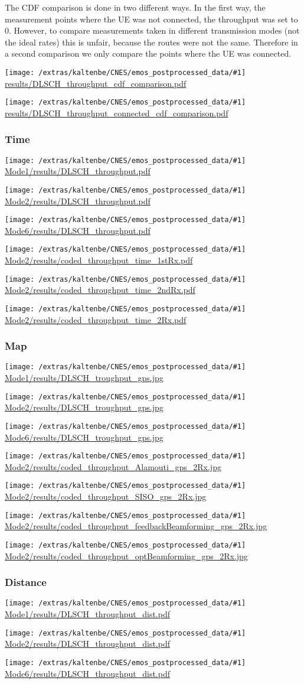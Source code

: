 \documentclass[a4paper,10pt]{article}
\newcommand{\printfile}[1]{
 \begin{minipage}{8cm}
  \centering
  \texttt{[image: /extras/kaltenbe/CNES/emos\_postprocessed\_data/\#1]}
  \url{#1}

 \end{minipage}
}
\begin{document}
The CDF comparison is done in two different ways. In the first way, the measurement points where the UE was not connected, the throughput was set to 0. However, to compare measurements taken in different transmission modes (not the ideal rates) this is unfair, because the routes were not the same. Therefore in a second comparison we only compare the points where the UE was connected.

\printfile{results/DLSCH_throughput_cdf_comparison.pdf}
\printfile{results/DLSCH_throughput_connected_cdf_comparison.pdf}

\subsubsection{Time}

\printfile{Mode1/results/DLSCH_throughput.pdf}
\printfile{Mode2/results/DLSCH_throughput.pdf}

\printfile{Mode6/results/DLSCH_throughput.pdf}
\printfile{Mode2/results/coded_throughput_time_1stRx.pdf}

\printfile{Mode2/results/coded_throughput_time_2ndRx.pdf}
\printfile{Mode2/results/coded_throughput_time_2Rx.pdf}


\subsubsection{Map}

\printfile{Mode1/results/DLSCH_troughput_gps.jpg}
\printfile{Mode2/results/DLSCH_troughput_gps.jpg}

\printfile{Mode6/results/DLSCH_troughput_gps.jpg}

\printfile{Mode2/results/coded_throughput_Alamouti_gps_2Rx.jpg}
\printfile{Mode2/results/coded_throughput_SISO_gps_2Rx.jpg}

\printfile{Mode2/results/coded_throughput_feedbackBeamforming_gps_2Rx.jpg}
\printfile{Mode2/results/coded_throughput_optBeamforming_gps_2Rx.jpg}


\subsubsection{Distance}

\printfile{Mode1/results/DLSCH_throughput_dist.pdf}
\printfile{Mode2/results/DLSCH_throughput_dist.pdf}

\printfile{Mode6/results/DLSCH_throughput_dist.pdf}

\end{document}
